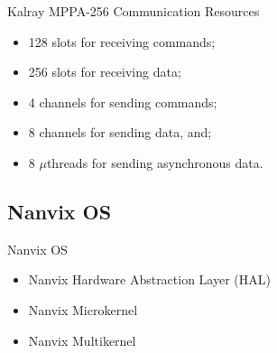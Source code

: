 		\begin{frame}[fragile]{Kalray MPPA-256 Communication Resources}
			\begin{itemize}
				\item 128 slots for receiving commands;
				\item 256 slots for receiving data;
				\item 4 channels for sending commands;
				\item 8 channels for sending data, and;
				\item 8 $\mu$threads for sending asynchronous data.
			\end{itemize}
		\end{frame}

	\subsection{Nanvix OS}

		\begin{frame}[fragile]{Nanvix OS}



			\begin{itemize}
				\item Nanvix Hardware Abstraction Layer (HAL)
				\item Nanvix Microkernel
				\item Nanvix Multikernel
			\end{itemize}

		\end{frame}


